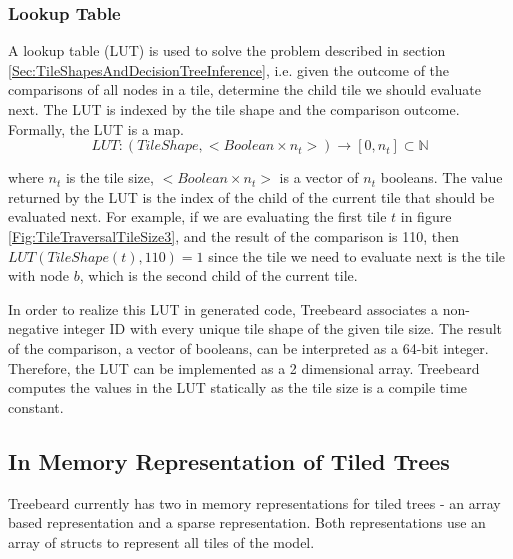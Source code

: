 \subsubsection{Lookup Table}
\label{sec:LookupTable}
A lookup table (LUT) is used to solve the problem described in section \ref{Sec:TileShapesAndDecisionTreeInference}, i.e. given the outcome of the comparisons of all nodes in a tile, determine the child tile we should evaluate next. The LUT is indexed by the tile shape and the comparison outcome. Formally, the LUT is a map.
\[
LUT : (TileShape, < Boolean \times n_t >) \rightarrow [0, n_t] \subset \mathbb{N}
\]

where $n_t$ is the tile size, $< Boolean \times n_t >$ is a vector of $n_t$ booleans. The value returned by the LUT is the index of the child of the current tile that should be evaluated next. For example, if we are evaluating the first tile $t$ in figure \ref{Fig:TileTraversalTileSize3}, and the result of the comparison is 110, then $LUT(TileShape(t), 110)=1$ since the tile we need to evaluate next is the tile with node $b$, which is the second child of the current tile.

In order to realize this LUT in generated code, Treebeard associates a non-negative integer ID with every unique tile shape of the given tile size. The result of the comparison, a vector of booleans, can be interpreted as a 64-bit integer. Therefore, the LUT can be implemented as a 2 dimensional array.
Treebeard computes the values in the LUT statically as the tile size is a compile time constant.

\subsection{In Memory Representation of Tiled Trees}
\label{Sec:MemoryRep}
Treebeard currently has two in memory representations for tiled trees - an array based representation and a sparse representation. Both representations use an array of structs to represent all tiles of the model. 


